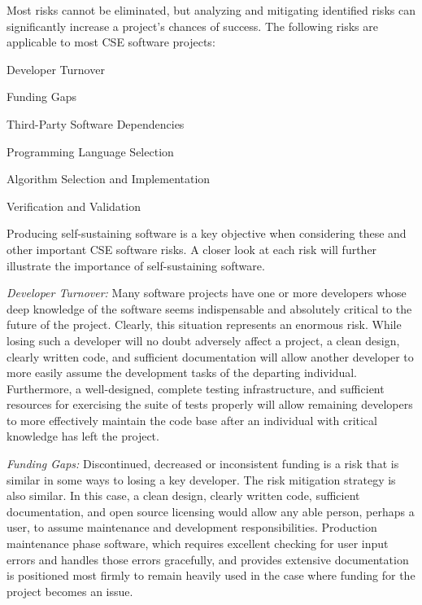 \documentclass[11pt]{SANDreport}
\begin{document}
Most risks cannot be eliminated, but analyzing and mitigating identified risks
can significantly increase a project's chances of success.  The following risks
are applicable to most CSE software projects:

\begin{compactitem}

{}\item Developer Turnover

{}\item Funding Gaps

{}\item Third-Party Software Dependencies

{}\item Programming Language Selection

{}\item Algorithm Selection and Implementation

{}\item Verification and Validation

\end{compactitem}

Producing self-sustaining software is a key objective when considering these
and other important CSE software risks.  A closer look at each risk will
further illustrate the importance of self-sustaining software.


\textit{Developer Turnover:} Many software projects have one or
more developers whose deep knowledge of the software seems indispensable and
absolutely critical to the future of the project.  Clearly, this situation
represents an enormous risk.  While losing such a developer will no doubt
adversely affect a project, a clean design,
clearly written code, and sufficient documentation
will allow another developer to more easily assume the development tasks
of the departing individual.  Furthermore, a well-designed, complete testing
infrastructure, and sufficient
resources for exercising the suite of tests properly will allow remaining
developers to more effectively maintain the code base after an individual
with critical knowledge has left the project.

\textit{Funding Gaps:} Discontinued, decreased or inconsistent funding is a
risk that is similar in some ways to losing a key developer.  The risk
mitigation strategy is also similar.  In this case, a clean design, clearly
written code, sufficient documentation, and open source licensing would
allow any able person, perhaps a user, to assume maintenance and
development responsibilities.  Production maintenance phase
software, which requires excellent checking for user input errors and handles
those errors gracefully, and provides extensive documentation is positioned
most firmly to remain heavily used in the case where funding for the project
becomes an issue.
\end{document}
